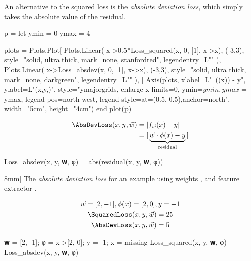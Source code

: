 An alternative to the squared loss is the \textit{absolute deviation loss},
which simply takes the absolute value of the residual.
\begin{marginfigure}[5mm]
  \begin{jlcode}
    p = let
        ymin = 0
        ymax = 4

        plots = Plots.Plot[
            Plots.Linear(
                x->0.5*Loss_squared(x, 0, [1], x->x), (-3,3), style="solid, ultra thick, mark=none, stanfordred", legendentry=L"\SquaredLoss"
            ),
            Plots.Linear(
                x->Loss_absdev(x, 0, [1], x->x), (-3,3), style="solid, ultra thick, mark=none, darkgreen", legendentry=L"\AbsDevLoss"
            ),
        ]
        Axis(plots,
             xlabel=L"~(\cdot\phi(x)) - y",
             ylabel=L"\Loss(x,y,)",
             style="ymajorgrids, enlarge x limits=0, ymin=$ymin, ymax=$ymax, legend pos=north west, legend style={at={(0.5,-0.5)},anchor=north}",
             width="5cm", height="4cm")
    end
    plot(p)
  \end{jlcode}
  \begin{center}
  \end{center}
\end{marginfigure}
\begin{equation*}
\begin{aligned}
    \AbsDevLoss(x, y, \vec{w}) &= |f_{\vec{w}}(x) - y|\\
                                &= |\underbrace{\vec{w} \cdot \phi(x)-y}_\text{residual}|
\end{aligned}
\end{equation*}
\begin{algorithm}
\begin{juliaverbatim}
Loss_absdev(x, y, 𝐰, φ) = abs(residual(x, y, 𝐰, φ))
\end{juliaverbatim}

\caption[][8mm]{
    \label{alg:abs_dev_loss}
    The \textit{absolute deviation loss} for an example  using weights , and feature extractor .
}
\end{algorithm}
\begin{overflowexample}
    \begin{gather*}
        \vec{w} = [2, -1], \phi(x) = [2, 0], y = -1\\
        \SquaredLoss(x, y, \vec{w}) = 25\\
        \AbsDevLoss(x, y, \vec{w}) = 5
    \end{gather*}
\begin{juliaconsole}
𝐰 = [2, -1]; φ = x->[2, 0]; y = -1; x = missing
Loss_squared(x, y, 𝐰, φ)
Loss_absdev(x, y, 𝐰, φ)
\end{juliaconsole}
\end{overflowexample}

